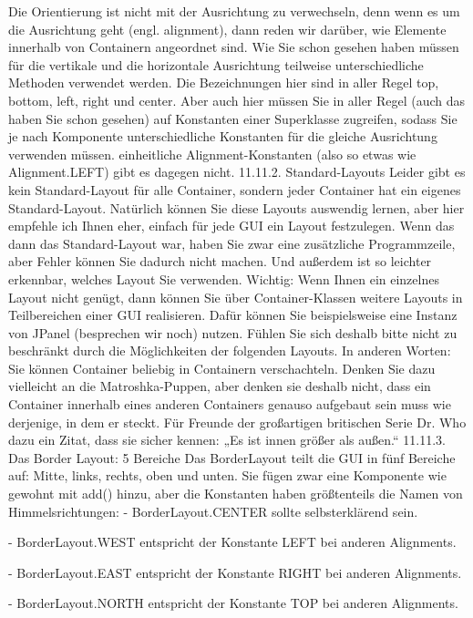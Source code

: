 Die Orientierung ist nicht mit der Ausrichtung zu verwechseln, denn wenn es um die Ausrichtung geht (engl. alignment), dann reden wir darüber, wie Elemente innerhalb von Containern angeordnet sind. Wie Sie schon gesehen haben müssen für die vertikale und die horizontale Ausrichtung teilweise unterschiedliche Methoden verwendet werden. Die Bezeichnungen hier sind in aller Regel top, bottom, left, right und center. Aber auch hier müssen Sie in aller Regel (auch das haben Sie schon gesehen) auf Konstanten einer Superklasse zugreifen, sodass Sie je nach Komponente unterschiedliche Konstanten für die gleiche Ausrichtung verwenden müssen. einheitliche Alignment-Konstanten (also so etwas wie Alignment.LEFT) gibt es dagegen nicht.
11.11.2.	Standard-Layouts
Leider gibt es kein Standard-Layout für alle Container, sondern jeder Container hat ein eigenes Standard-Layout. Natürlich können Sie diese Layouts auswendig lernen, aber hier empfehle ich Ihnen eher, einfach für jede GUI ein Layout festzulegen. Wenn das dann das Standard-Layout war, haben Sie zwar eine zusätzliche Programmzeile, aber Fehler können Sie dadurch nicht machen. Und außerdem ist so leichter erkennbar, welches Layout Sie verwenden.
Wichtig: Wenn Ihnen ein einzelnes Layout nicht genügt, dann können Sie über Container-Klassen weitere Layouts in Teilbereichen einer GUI realisieren. Dafür können Sie beispielsweise eine Instanz von JPanel (besprechen wir noch) nutzen. Fühlen Sie sich deshalb bitte nicht zu beschränkt durch die Möglichkeiten der folgenden Layouts.
In anderen Worten: Sie können Container beliebig in Containern verschachteln. Denken Sie dazu vielleicht an die Matroshka-Puppen, aber denken sie deshalb nicht, dass ein Container innerhalb eines anderen Containers genauso aufgebaut sein muss wie derjenige, in dem er steckt. Für Freunde der großartigen britischen Serie Dr. Who dazu ein Zitat, dass sie sicher kennen: „Es ist innen größer als außen.“
11.11.3.	Das Border Layout: 5 Bereiche
Das BorderLayout teilt die GUI in fünf Bereiche auf: Mitte, links, rechts, oben und unten. Sie fügen zwar eine Komponente wie gewohnt mit add() hinzu, aber die Konstanten haben größtenteils die Namen von Himmelsrichtungen:
-	BorderLayout.CENTER sollte selbsterklärend sein.

-	BorderLayout.WEST entspricht der Konstante LEFT bei anderen Alignments.

-	BorderLayout.EAST entspricht der Konstante RIGHT bei anderen Alignments.

-	BorderLayout.NORTH entspricht der Konstante TOP bei anderen Alignments.


